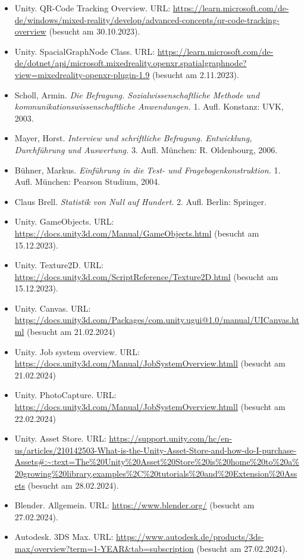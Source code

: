 \begin{itemize}
    \item Unity. QR-Code Tracking Overview. URL: \url{https://learn.microsoft.com/de-de/windows/mixed-reality/develop/advanced-concepts/qr-code-tracking-overview} (besucht am 30.10.2023).
    \item Unity. SpacialGraphNode Class. URL: \url{https://learn.microsoft.com/de-de/dotnet/api/microsoft.mixedreality.openxr.spatialgraphnode?view=mixedreality-openxr-plugin-1.9} (besucht am 2.11.2023).
    \item Scholl, Armin. \textit{Die Befragung. Sozialwissenschaftliche Methode und kommunikationswissenschaftliche Anwendungen.} 1. Aufl. Konstanz: UVK, 2003.
    \item Mayer, Horst. \textit{Interview und schriftliche Befragung. Entwicklung, Durchführung und Auswertung.} 3. Aufl. München: R. Oldenbourg, 2006.
    \item Bühner, Markus. \textit{Einführung in die Test- und Fragebogenkonstruktion.} 1. Aufl. München: Pearson Studium, 2004.
    \item Claus Brell. \textit{Statistik von Null auf Hundert.} 2. Aufl. Berlin: Springer.
    \item Unity. GameObjects. URL: \url{https://docs.unity3d.com/Manual/GameObjects.html} (besucht am 15.12.2023).
    \item Unity. Texture2D. URL: \url{https://docs.unity3d.com/ScriptReference/Texture2D.html} (besucht am 15.12.2023).
    \item Unity. Canvas. URL: \url{https://docs.unity3d.com/Packages/com.unity.ugui@1.0/manual/UICanvas.html} (besucht am 21.02.2024)
    \item Unity. Job system overview. URL: \url{https://docs.unity3d.com/Manual/JobSystemOverview.htmll} (besucht am 21.02.2024)
    \item Unity. PhotoCapture. URL: \url{https://docs.unity3d.com/Manual/JobSystemOverview.htmll} (besucht am 22.02.2024)
    \item Unity. Asset Store. URL: \url{https://support.unity.com/hc/en-us/articles/210142503-What-is-the-Unity-Asset-Store-and-how-do-I-purchase-Assets#:~:text=The%20Unity%20Asset%20Store%20is%20home%20to%20a%20growing%20library,examples%2C%20tutorials%20and%20Extension%20Assets} (besucht am 28.02.2024).
    \item Blender. Allgemein. URL: \url{https://www.blender.org/} (besucht am 27.02.2024).
    \item Autodesk. 3DS Max. URL: \url{https://www.autodesk.de/products/3ds-max/overview?term=1-YEAR&tab=subscription} (besucht am 27.02.2024).

\end{itemize}
